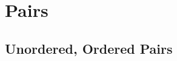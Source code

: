 \documentclass{book}
\begin{document}
% 			
% 			
% 		
% 		
% 		
	\chapter{Pairs}
		\section{Unordered, Ordered Pairs}
		
\end{document}
